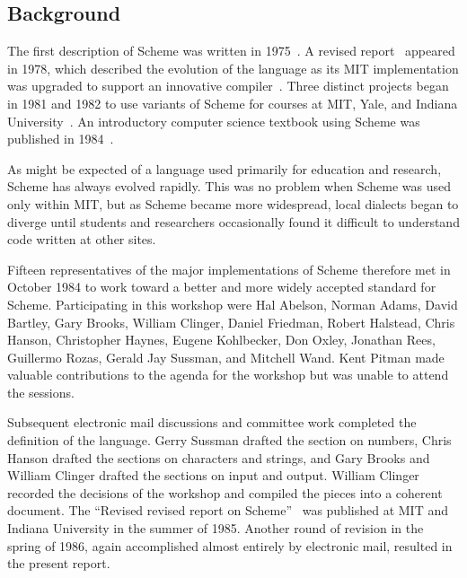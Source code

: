 \subsection*{Background}

\vest The first description of Scheme was written in
1975~\cite{Scheme75}.  A revised report~\cite{Scheme78}
 appeared in 1978, which described the evolution
of the language as its MIT implementation was upgraded to support an
innovative compiler~\cite{Rabbit}.  Three distinct projects began in
1981 and 1982 to use variants of Scheme for courses at MIT, Yale, and
Indiana University~\cite{Rees82,MITScheme,Scheme311}.  An introductory
computer science textbook using Scheme was published in
1984~\cite{SICP}.

\vest As might be expected of a language used primarily for education and
research, Scheme has always evolved rapidly.  This was no problem when
Scheme was used only within MIT, but as Scheme became more widespread,
local dialects began to diverge until students and researchers
occasionally found it difficult to understand code written at other
sites.

Fifteen representatives of the major implementations of Scheme therefore
met in October 1984 to work toward a better and more widely accepted
standard for Scheme.
Participating in this workshop were Hal Abelson, Norman Adams, David
Bartley, Gary Brooks, William Clinger, Daniel Friedman, Robert Halstead,
Chris Hanson, Christopher Haynes, Eugene Kohlbecker, Don Oxley, Jonathan Rees,
Guillermo Rozas, Gerald Jay Sussman, and Mitchell Wand.  Kent Pitman
made valuable contributions to the agenda for the workshop but was
unable to attend the sessions.

Subsequent electronic mail discussions and committee work completed the
definition of the language.
Gerry Sussman drafted the section on numbers, Chris Hanson drafted the
sections on characters and strings, and Gary Brooks and William Clinger
drafted the sections on input and output.
William Clinger recorded the decisions of the workshop and
compiled the pieces into a coherent document.
The ``Revised revised report on Scheme''~\cite{RRRS}
was published at MIT and Indiana University in the summer of 1985.
Another round of revision in the spring of 1986, again accomplished almost
entirely by electronic mail, resulted in the present report.


